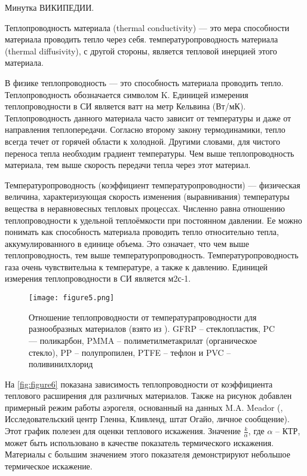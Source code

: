 \begin{adjustwidth}{3.5em}{3.5em}
{\color{green} Минутка ВИКИПЕДИИ.

Теплопроводность материала (thermal conductivity) --- это мера способности материала проводить тепло через себя. температуропроводность материала (thermal diffusivity), с другой стороны, является тепловой инерцией этого материала.


В физике теплопроводность --- это способность материала проводить тепло. Теплопроводность обозначается символом K. Единицей измерения теплопроводности в СИ является ватт на метр Кельвина (Вт/мК). Теплопроводность данного материала часто зависит от температуры и даже от направления теплопередачи. Согласно второму закону термодинамики, тепло всегда течет от горячей области к холодной. Другими словами, для чистого переноса тепла необходим градиент температуры. Чем выше теплопроводность материала, тем выше скорость передачи тепла через этот материал. 


Температуропроводность (коэффициент температуропроводности) --- физическая величина, характеризующая скорость изменения (выравнивания) температуры вещества в неравновесных тепловых процессах. Численно равна отношению теплопроводности к удельной теплоёмкости при постоянном давлении.  Ее можно понимать как способность материала проводить тепло относительно тепла, аккумулированного в единице объема. Это означает, что чем выше теплопроводность, тем выше температуропроводность.  Температуропроводность газа очень чувствительна к температуре, а также к давлению. Единицей измерения теплопроводности в СИ является м2с-1.
}
\end{adjustwidth}

\begin{figure}[h!]
\centering
\texttt{[image: figure5.png]}%
\caption{Отношение теплопроводности от температурапроводности для разнообразных материалов  (взято из \cite{ashby2005}). GFRP -- стеклопластик, PC--- поликарбон, PMMA -- полиметилметакрилат (органическое стекло), PP -- полупропилен, PTFE -- тефлон и PVC -- поливинилхлорид}
\label{fig:figure5}
\end{figure}

На \cref{fig:figure6} показана зависимость теплопроводности от коэффициента теплового расширения для различных материалов. Также на рисунок добавлен примерный режим работы аэрогеля, основанный на данных M.A. Meador (\cite{meador2005}, Исследовательский центр Гленна, Кливленд, штат Огайо, личное сообщение). Этот график полезен для оценки теплового искажения. Значение \(\frac{k}{\alpha}\), где \(\alpha\) -- КТР, может быть использовано в качестве показатель термического искажения. Материалы с большим значением этого показателя демонстрируют небольшое термическое искажение.


